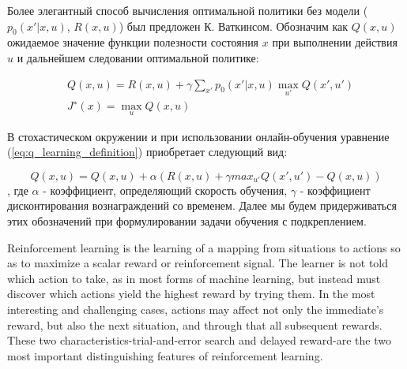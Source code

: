 Более элегантный способ вычисления оптимальной политики без модели ($p_0(x'|x,u)$, $R(x,u)$) был предложен \cite{Watkins:1989} К. Ваткинсом. Обозначим как $Q(x, u)$ ожидаемое значение функции полезности состояния $x$ при выполнении действия $u$ и дальнейшем следовании оптимальной политике:

\begin{equation}
    \label{eq:q_learning_definition}
    \begin{split}
      & Q(x, u) = R(x, u) + \gamma \sum_{x'} {
          p_0(x'|x, u) \max_{u'} Q(x', u')
       }
       \\
      & J^{∗}(x) = \max_{u} Q(x,u)
     \end{split}
\end{equation}

В стохастическом окружении и при использовании онлайн-обучения уравнение (\ref{eq:q_learning_definition}) приобретает следующий вид:

\begin{equation}
    \label{eq:q_learning_online_stochastic}
    Q(x, u) = Q(x, u) + \alpha(R(x, u) + \gamma max_{u'} Q(x', u') − Q(x, u))
\end{equation},
где $\alpha$ - коэффициент, определяющий скорость обучения, $\gamma$ - коэффициент дисконтирования вознаграждений со временем. Далее мы будем придерживаться этих обозначений при формулировании задачи обучения с подкреплением.



\cite{лаптев2011применение, Magnusson:2012:SCW:2351316.2351327, hung2006applying, nelson2008exploiting, arisholm2007data, nguyen2012timely}
Reinforcement learning is the learning of a mapping from situations to actions so as to maximize a scalar reward or reinforcement signal. The learner is not told which action to take, as in most forms of machine learning, but instead must discover which actions yield the highest reward by trying them. In the most interesting and challenging cases, actions may affect not only the immediate's reward, but also the next situation, and through that all subsequent rewards. These two characteristics-trial-and-error search and delayed reward-are the two most important distinguishing features of reinforcement learning. \cite{book:963927, sutton1998introduction}




